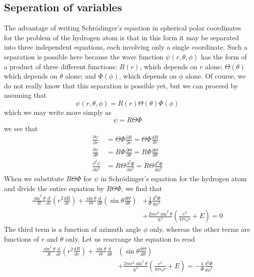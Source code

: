 \subsection{Seperation of variables}
The advantage of writing Schrödinger's equation in spherical polar coordinates for the problem of the hydrogen atom is that in this form it may be separated into three independent equations, each involving only a single coordinate. Such a separation is possible here because the wave function $\psi(r, \theta, \phi)$ has the form of a product of three different functions: $R(r)$, which depends on $r$ alone; $\Theta(\theta)$ which depends on $\theta$ alone; and $\Phi(\phi)$, which depends on $\phi$ alone. Of course, we do not really know that this separation is possible yet, but we can proceed by assuming that\\
$$\psi(r, \theta, \phi)=R(r) \Theta(\theta) \Phi(\phi)$$
which we may write more simply as
$$
\psi=R \Theta \Phi
$$
we see that
$$
\begin{aligned}
\frac{\partial \psi}{\partial r} &=\Theta \Phi \frac{\partial R}{\partial r}=\Theta \Phi \frac{d R}{d r} \\
\frac{\partial \psi}{\partial \theta} &=R \Phi \frac{\partial \Theta}{\partial \theta}=R \Phi \frac{d \Theta}{d \theta} \\
\frac{\partial^{2} \psi}{\partial \phi^{2}} &=R \Theta \frac{\partial^{2} \Phi}{\partial \phi^{2}}=R \Theta \frac{d^{2} \Phi}{d \phi^{2}}
\end{aligned}
$$
When we substitute $R \Theta \Phi$ for $\psi$ in Schrödinger's equation for the hydrogen atom and divide the entire equation by $R \Theta \Phi$, we find that
$$
\begin{aligned}
\frac{\sin ^{2} \theta}{R} \frac{d}{d r}\left(r^{2} \frac{d R}{d r}\right)+\frac{\sin \theta}{\Theta} \frac{d}{d \theta}\left(\sin \theta \frac{d \Theta}{d \theta}\right) &+\frac{1}{\Phi} \frac{d^{2} \Phi}{d \phi^{2}} \\
&+\frac{2 m r^{2} \sin ^{2} \theta}{\hbar^{2}}\left(\frac{e^{2}}{4 \pi \epsilon_{0} r}+E\right)=0
\end{aligned}
$$
The third term  is a function of azimuth angle $\phi$ only, whereas the other terms are functions of $r$ and $\theta$ only.
Let us rearrange the equation to read
$$
\begin{aligned}
\frac{\sin ^{2} \theta}{R} \frac{d}{d r}\left(r^{2} \frac{d R}{d r}\right)+\frac{\sin \theta}{\Theta} \frac{d}{d \theta} &\left(\sin \theta \frac{d \Theta}{d \theta}\right) \\
&+\frac{2 m r^{2} \sin ^{2} \theta}{\hbar^{2}}\left(\frac{e^{2}}{4 \pi \epsilon_{0} r}+E\right)=-\frac{1}{\Phi} \frac{d^{2} \Phi}{d \phi^{2}}
\end{aligned}
$$
